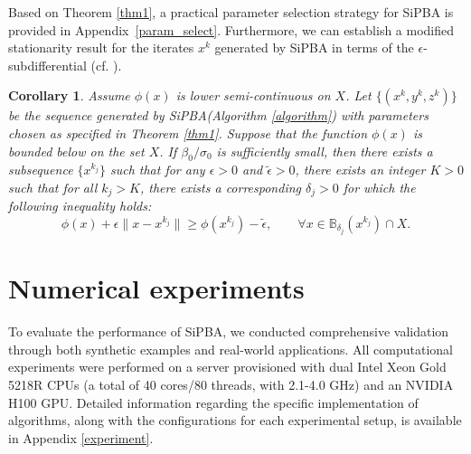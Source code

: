 \documentclass{article}
\newtheorem{corollary}[theorem]{Corollary}
\begin{document}
Based on Theorem \ref{thm1}, a practical parameter selection strategy for SiPBA is provided in Appendix~\ref{param_select}.
Furthermore,  we can establish a modified stationarity result for the iterates $x^k$ generated by SiPBA in terms of the
$\epsilon$-subdifferential (cf. \cite[Theorem 1.26]{mordukhovich2018variational}).

\begin{corollary}\label{thm2}
Assume $\phi(x)$ is lower semi-continuous on $X$. Let $\{(x^k, y^k, z^k)\}$ be the sequence generated by SiPBA(Algorithm \ref{algorithm}) with parameters chosen as specified in Theorem \ref{thm1}. Suppose that the function $\phi(x)$ is bounded below on the set $X$. 
If $ \beta_0/\sigma_0$ is sufficiently small, then there exists a subsequence $\{x^{k_j}\}$ such that for any $\epsilon >0$ and $\tilde{\epsilon} >0$, there exists an integer $K > 0$ such that for all $k_j>K$, there exists a corresponding $\delta_j > 0$ for which the following inequality holds:
\[
\phi(x) + \epsilon \|x -x^{k_j}\| \ge \phi(x^{k_j})- \tilde{\epsilon}, \qquad \forall x \in \mathbb{B}_{\delta_{j}}(x^{k_j}) \cap X.
\]
\end{corollary}


\section{Numerical experiments}\label{numerical experiment}
To evaluate the performance of SiPBA, we conducted comprehensive validation through both synthetic examples and real-world applications. %
All computational experiments were performed on a server provisioned with dual Intel Xeon Gold 5218R CPUs (a total of 40 cores/80 threads, with 2.1-4.0 GHz) and an NVIDIA H100 GPU. Detailed information regarding the specific implementation of algorithms, along with the configurations for each experimental setup, is available in Appendix \ref{experiment}.
\end{document}
